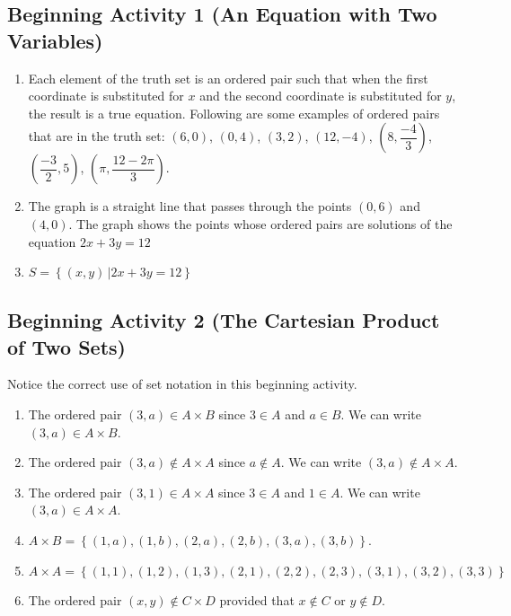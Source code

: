 \documentclass[11pt]{article}
\begin{document}


\subsection*{Beginning Activity 1 (An Equation with Two Variables)}
\begin{enumerate}
\item Each element of the truth set is an ordered pair such that when the first coordinate is substituted for  $x$  and the second coordinate is substituted for  $y$, the result is a true equation.  Following are some examples of ordered pairs that are in the truth set:  
$( {6, 0} )$, $( {0, 4} )$, $( {3, 2} )$, 
$( {12,  - 4} )$, $\left( {8, \dfrac{{ - 4}}{3}} \right)$, 
$\left( {\dfrac{{ - 3}}{2}, 5} \right)$, $\left( {\pi , \dfrac{{12 - 2\pi }}{3}} \right)$.

\item The graph is a straight line that passes through the points $( 0, 6 )$ and 
$( 4, 0 )$.  The graph shows the points whose ordered pairs are solutions of the equation  $2x + 3y = 12$

\item $S = \left\{ {\left. {( {x, y} )\,} \right| 2x + 3y = 12} \right\}$
\end{enumerate}
\hbreak



\subsection*{Beginning Activity 2 (The Cartesian Product of Two Sets)}
Notice the correct use of set notation in this beginning activity.
\begin{enumerate}
\item The ordered pair  $( {3, a} ) \in A \times B$  since  $3 \in A$  and  $a \in B$.  We can write $(3, a) \in A \times B$.

\item The ordered pair  $( {3, a} ) \notin A \times A$  since  $a \notin A$.  We can write $(3, a) \notin A \times A$.

\item The ordered pair $( {3, 1} ) \in A \times A$  since  $3 \in A$  and  $1 \in A$.  We can write $(3, a) \in A \times A$.

\item $A \times B = \left\{ {( {1, a} ), ( {1, b} ), ( {2, a} ), ( {2, b} ), ( {3, a} ), ( {3, b} )} \right\}$.

\item $A \times A = \left\{ {( {1, 1} ), ( {1, 2} ), ( {1, 3} ), ( {2, 1} ), ( {2, 2} ), ( {2, 3} ), ( {3, 1} ), ( {3, 2} ), ( {3, 3} )} \right\}$

\item The ordered pair  $( {x, y} ) \notin C \times D$  provided that  
$x \notin C$ or $y \notin D$.
\end{enumerate}
\hbreak
\end{document}
